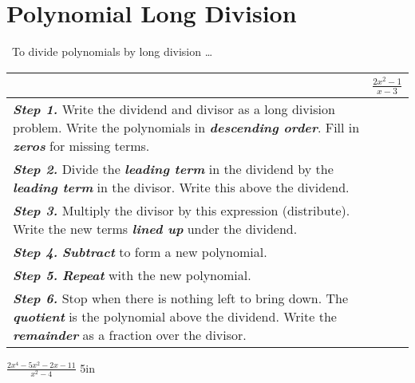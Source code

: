 \section{Polynomial Long Division}

\begin{myConcept}{~To divide polynomials by long division \dots}
    \begin{center}
        \begin{tabular}{m{}|p{}}
            & 
            {\Large $ \frac{2x^2  -1}{x-3} $}
            \rule{0in}{1\baselineskip}
            \\ \hline
            {\bfseries\itshape Step 1.}
            Write the dividend and divisor
            as a long division problem.
            Write the polynomials in {\bfseries\itshape descending order}.
            Fill in {\bfseries\itshape zeros} for missing terms. 
            & 
            \rule{0in}{2\baselineskip}
            \\ \hline
            {\bfseries\itshape Step 2.}
            Divide the {\bfseries\itshape leading term} in the dividend 
            by the {\bfseries\itshape leading term} in the divisor.
            Write this above the dividend.
            & 
            \rule{0in}{4\baselineskip}
            \\ \hline
            {\bfseries\itshape Step 3.}
            Multiply the divisor by this expression (distribute).
            Write the new terms {\bfseries\itshape lined up} under the dividend.
            & 
            \rule{0in}{4\baselineskip}
            \\ \hline
            {\bfseries\itshape Step 4.}
            {\bfseries\itshape Subtract} to form a new polynomial.
            & 
            \rule{0in}{7\baselineskip}
            \\ \hline
            {\bfseries\itshape Step 5.}
            {\bfseries\itshape Repeat} with the new polynomial.
            & 
            \rule{0in}{9\baselineskip}
            \\ \hline
            {\bfseries\itshape Step 6.}
            Stop when there is nothing left to bring down.
            The {\bfseries\itshape quotient} is the polynomial above the dividend.
            Write the {\bfseries\itshape remainder} as a fraction over the divisor.
            & 
            \\ 
        \end{tabular}
    \end{center}
\end{myConcept}

    {
        \Large
        $\frac
            {2x^4 - 5x^2 - 2x - 11} 
            {x^2 - 4}
        $
    }
    {5in}
